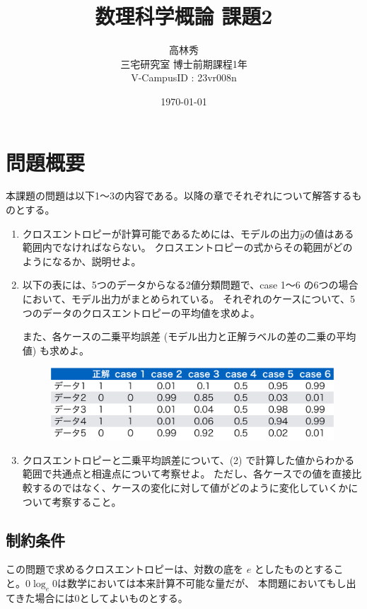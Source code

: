 \documentclass{article}[jsarticle]
\title{数理科学概論 課題2}
\author{高林秀 \\ 三宅研究室 博士前期課程1年 \\ V-CampusID : 23vr008n}
\date{\today}
\begin{document}
\maketitle

\setcounter{section}{-1}

\section{問題概要}
本課題の問題は以下1～3の内容である。以降の章でそれぞれについて解答するものとする。

\begin{enumerate}
    \item クロスエントロピーが計算可能であるためには、モデルの出力$\hat{y}$の値はある範囲内でなければならない。
    クロスエントロピーの式からその範囲がどのようになるか、説明せよ。

    \item 以下の表には、5つのデータからなる2値分類問題で、case 1～6 の6つの場合において、モデル出力がまとめられている。
    それぞれのケースについて、5つのデータのクロスエントロピーの平均値を求めよ。\par 
    また、各ケースの二乗平均誤差 (モデル出力と正解ラベルの差の二乗の平均値) も求めよ。
    \begin{figure}[H]
        \centering
        \includegraphics[scale=0.3]{./2023-06-23215207.png}
    \end{figure}

    \item クロスエントロピーと二乗平均誤差について、(2) で計算した値からわかる範囲で共通点と相違点について考察せよ。
    ただし、各ケースでの値を直接比較するのではなく、ケースの変化に対して値がどのように変化していくかについて考察すること。
    
\end{enumerate}

\subsection{制約条件}
この問題で求めるクロスエントロピーは、対数の底を $e$ としたものとすること。$0\log_{e}0$は数学においては本来計算不可能な量だが、
本問題においてもし出てきた場合には0としてよいものとする。
\end{document}
